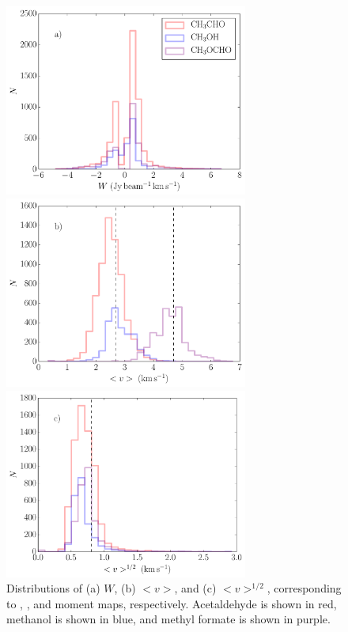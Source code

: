 \documentclass[iop,twocolappendix]{emulateapj}
\begin{document}
\begin{figure}[t]
\begin{center}
\includegraphics[width=8cm]{mom0_hist.pdf}

\includegraphics[width=8cm]{mom1_hist.pdf}

\includegraphics[width=8cm]{mom2_hist.pdf}
\caption{Distributions of (a) $W$, (b) $<v>$, and (c) $<v>^{1/2}$, corresponding to {\momzero}, {\momone}, and {\momtwo} moment maps, respectively. Acetaldehyde is shown in red, methanol is shown in blue, and methyl formate is shown in purple.}
\label{fig:momenthist}
\end{center}
\end{figure}
\end{document}
